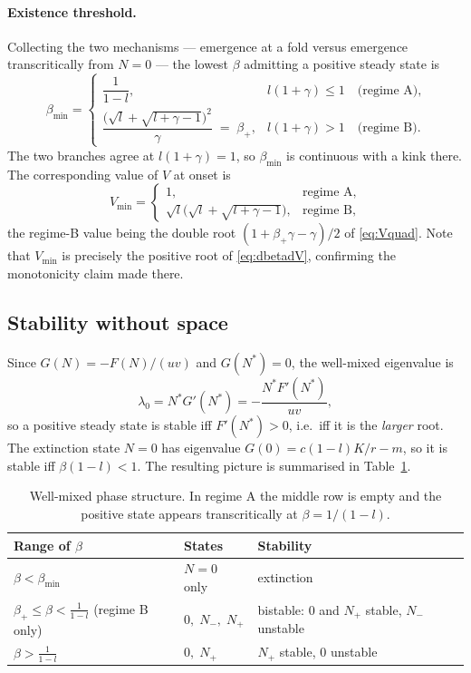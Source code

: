 \documentclass[11pt,a4paper]{article}
\newcommand{\Ns}{N^{*}}
\theoremstyle{plain}
\theoremstyle{remark}
\begin{document}
\paragraph{Existence threshold.} Collecting the two mechanisms --- emergence at
a fold versus emergence transcritically from $N=0$ --- the lowest $\beta$
admitting a positive steady state is
\begin{equation}
\boxed{\;
\beta_{\min} =
\begin{cases}
\dfrac{1}{1-l}, & l(1+\gamma)\le 1 \quad\text{(regime A)},\\[2.2ex]
\dfrac{\bigl(\sqrt{l}+\sqrt{l+\gamma-1}\bigr)^{2}}{\gamma}\;=\;\beta_+,
& l(1+\gamma)>1 \quad\text{(regime B)} .
\end{cases}}
\label{eq:betamin}
\end{equation}
The two branches agree at $l(1+\gamma)=1$, so $\beta_{\min}$ is continuous with
a kink there. The corresponding value of $V$ at onset is
\begin{equation}
V_{\min} =
\begin{cases}
1, & \text{regime A},\\[1ex]
\sqrt{l}\bigl(\sqrt{l}+\sqrt{l+\gamma-1}\bigr), & \text{regime B},
\end{cases}
\label{eq:Vmin}
\end{equation}
the regime-B value being the double root $(1+\beta_+\gamma-\gamma)/2$ of
\eqref{eq:Vquad}. Note that $V_{\min}$ is precisely the positive root of
\eqref{eq:dbetadV}, confirming the monotonicity claim made there.

\subsection{Stability without space}

Since $G(N)=-F(N)/(uv)$ and $G(\Ns)=0$, the well-mixed eigenvalue is
\begin{equation}
\lambda_0 = \Ns G'(\Ns) = -\frac{\Ns F'(\Ns)}{u v},
\end{equation}
so a positive steady state is stable iff $F'(\Ns)>0$, i.e.\ iff it is the
\emph{larger} root. The extinction state $N=0$ has eigenvalue
$G(0) = c(1-l)K/r - m$, so it is stable iff $\beta(1-l)<1$. The resulting
picture is summarised in Table~\ref{tab:phases}.

\begin{table}[t]
\centering
\begin{tabular}{lll}
\toprule
Range of $\beta$ & States & Stability \\
\midrule
$\beta<\beta_{\min}$ & $N=0$ only & extinction \\
$\beta_+\le\beta<\frac{1}{1-l}$ (regime B only) & $0,\;N_-,\;N_+$ &
bistable: $0$ and $N_+$ stable, $N_-$ unstable \\
$\beta>\frac{1}{1-l}$ & $0,\;N_+$ & $N_+$ stable, $0$ unstable \\
\bottomrule
\end{tabular}
\caption{Well-mixed phase structure. In regime A the middle row is empty and
the positive state appears transcritically at $\beta=1/(1-l)$.}
\label{tab:phases}
\end{table}
\end{document}
